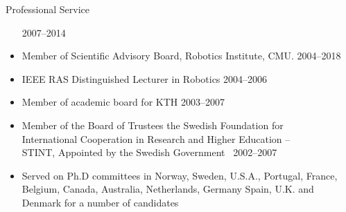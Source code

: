 \documentclass{article}
\begin{document}
\begin{cv}
\begin{cvlist}{Professional Service}
\begin{itemize}
			      \cftdotfill{\cftdotsep} 2007--2014
			\item Member of Scientific Advisory Board, Robotics Institute, CMU.\@
			      \cftdotfill{\cftdotsep} 2004--2018
			\item IEEE RAS Distinguished Lecturer in Robotics \cftdotfill{\cftdotsep}
			      2004--2006
			\item Member of academic board for KTH \cftdotfill{\cftdotsep} 2003--2007
			\item Member of the Board of Trustees the Swedish Foundation for\\
			      International Cooperation in Research and Higher Education --\\
			      STINT, Appointed by the Swedish Government\ \cftdotfill{\cftdotsep}
			      2002--2007
			\item Served on Ph.D committees in Norway, Sweden, U.S.A., Portugal, France,
			      Belgium, Canada, Australia, Netherlands, Germany Spain, U.K. and
			      Denmark for a number of candidates
		\end{itemize}


\end{cvlist}
\end{cv}
\end{document}
